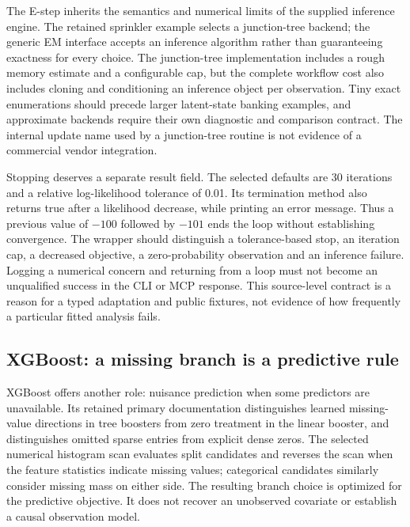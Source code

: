 The E-step inherits the semantics and numerical limits of the supplied inference engine. The retained sprinkler example selects a junction-tree backend; the generic EM interface accepts an inference algorithm rather than guaranteeing exactness for every choice. The junction-tree implementation includes a rough memory estimate and a configurable cap, but the complete workflow cost also includes cloning and conditioning an inference object per observation. Tiny exact enumerations should precede larger latent-state banking examples, and approximate backends require their own diagnostic and comparison contract. The internal update name used by a junction-tree routine is not evidence of a commercial vendor integration.~\citep{exec25_ctm_libdai}

Stopping deserves a separate result field. The selected defaults are 30 iterations and a relative log-likelihood tolerance of 0.01. Its termination method also returns true after a likelihood decrease, while printing an error message. Thus a previous value of $-100$ followed by $-101$ ends the loop without establishing convergence. The wrapper should distinguish a tolerance-based stop, an iteration cap, a decreased objective, a zero-probability observation and an inference failure. Logging a numerical concern and returning from a loop must not become an unqualified success in the CLI or MCP response. This source-level contract is a reason for a typed adaptation and public fixtures, not evidence of how frequently a particular fitted analysis fails.~\citep{exec25_ctm_libdai,exec25_ctm_choice}

\subsection*{XGBoost: a missing branch is a predictive rule}
XGBoost offers another role: nuisance prediction when some predictors are unavailable. Its retained primary documentation distinguishes learned missing-value directions in tree boosters from zero treatment in the linear booster, and distinguishes omitted sparse entries from explicit dense zeros. The selected numerical histogram scan evaluates split candidates and reverses the scan when the feature statistics indicate missing values; categorical candidates similarly consider missing mass on either side. The resulting branch choice is optimized for the predictive objective. It does not recover an unobserved covariate or establish a causal observation model.~\citep{exec25_ctm_xgboost}

